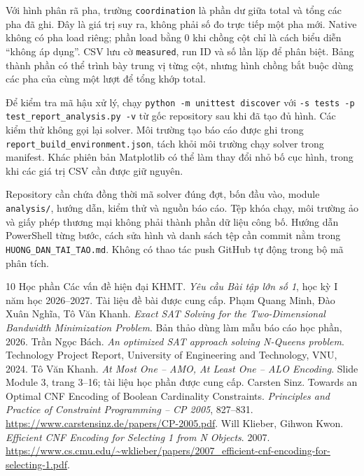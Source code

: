 Với hình phân rã pha, trường \texttt{coordination} là phần dư giữa total và tổng các pha đã ghi. Đây là giá trị suy ra, không phải số đo trực tiếp một pha mới. Native không có pha load riêng; phần load bằng 0 khi chồng cột chỉ là cách biểu diễn ``không áp dụng''. CSV lưu cờ \texttt{measured}, run ID và số lần lặp để phân biệt. Bảng thành phần có thể trình bày trung vị từng cột, nhưng hình chồng bắt buộc dùng các pha của cùng một lượt để tổng khớp total.

Để kiểm tra mã hậu xử lý, chạy \texttt{python -m unittest discover} với \texttt{-s tests -p test\_report\_analysis.py -v} từ gốc repository sau khi đã tạo đủ hình. Các kiểm thử không gọi lại solver. Môi trường tạo báo cáo được ghi trong \texttt{report\_build\_environment.json}, tách khỏi môi trường chạy solver trong manifest. Khác phiên bản Matplotlib có thể làm thay đổi nhỏ bố cục hình, trong khi các giá trị CSV cần được giữ nguyên.

Repository cần chứa đồng thời mã solver đúng đợt, bốn đầu vào, module \texttt{analysis/}, hướng dẫn, kiểm thử và nguồn báo cáo. Tệp khóa chạy, môi trường ảo và giấy phép thương mại không phải thành phần dữ liệu công bố. Hướng dẫn PowerShell từng bước, cách sửa hình và danh sách tệp cần commit nằm trong \texttt{HUONG\_DAN\_TAI\_TAO.md}. Không có thao tác push GitHub tự động trong bộ mã phân tích.

\FloatBarrier
\begin{thebibliography}{10}
 Học phần Các vấn đề hiện đại KHMT. \emph{Yêu cầu Bài tập lớn số 1}, học kỳ I năm học 2026--2027. Tài liệu đề bài được cung cấp.
 Phạm Quang Minh, Đào Xuân Nghĩa, Tô Văn Khanh. \emph{Exact SAT Solving for the Two-Dimensional Bandwidth Minimization Problem}. Bản thảo dùng làm mẫu báo cáo học phần, 2026.
 Trần Ngọc Bách. \emph{An optimized SAT approach solving N-Queens problem}. Technology Project Report, University of Engineering and Technology, VNU, 2024.
 Tô Văn Khanh. \emph{At Most One -- AMO, At Least One -- ALO Encoding}. Slide Module 3, trang 3--16; tài liệu học phần được cung cấp.
 Carsten Sinz. Towards an Optimal CNF Encoding of Boolean Cardinality Constraints. \emph{Principles and Practice of Constraint Programming -- CP 2005}, 827--831. \url{https://www.carstensinz.de/papers/CP-2005.pdf}.
 Will Klieber, Gihwon Kwon. \emph{Efficient CNF Encoding for Selecting 1 from N Objects}. 2007. \url{https://www.cs.cmu.edu/~wklieber/papers/2007_efficient-cnf-encoding-for-selecting-1.pdf}.
\end{thebibliography}
